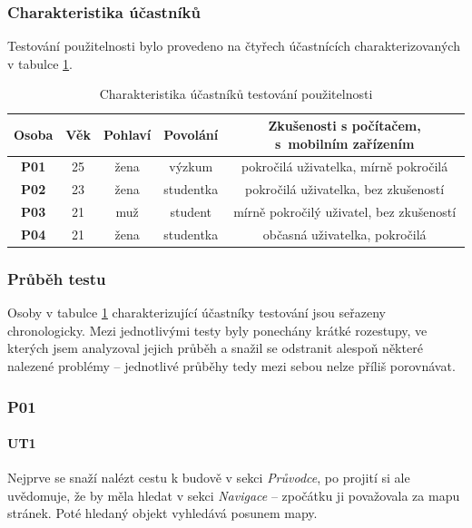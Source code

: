 \subsubsection{Charakteristika účastníků}
Testování použitelnosti bylo provedeno na čtyřech účastnících charakterizovaných v tabulce \ref{tab:charakteristikaUcastniku}. %
\begin{table}
\begin{center}
\begin{threeparttable}
\begin{tabular}{|c|c|c|c|c|}
\hline
\textbf{Osoba} & \textbf{Věk} & \textbf{Pohlaví} & \textbf{Povolání} & \parbox{2.2in}{\smallskip\textbf{Zkušenosti s počítačem, s~mobilním zařízením}\smallskip} \\
\hline
\textbf{P01} & 25 & žena & výzkum & \parbox{2.2in}{\smallskip pokročilá uživatelka, mírně pokročilá\smallskip} \\
\textbf{P02} & 23 & žena & studentka & \parbox{2.2in}{\smallskip pokročilá uživatelka, bez zkušeností\smallskip} \\
\textbf{P03} & 21 & muž & student & \parbox{2.2in}{\smallskip mírně pokročilý uživatel, bez zkušeností\smallskip} \\
\textbf{P04} & 21 & žena & studentka & \parbox{2.2in}{\smallskip občasná uživatelka, pokročilá\smallskip} \\
\hline
\end{tabular}
\caption{Charakteristika účastníků testování použitelnosti}
\label{tab:charakteristikaUcastniku}
\end{threeparttable}
\end{center}
\end{table}

\subsubsection{Průběh testu}
Osoby v tabulce \ref{tab:charakteristikaUcastniku} charakterizující účastníky testování jsou seřazeny chronologicky. Mezi jednotlivými testy byly ponechány krátké rozestupy, ve kterých jsem analyzoval jejich průběh a snažil se odstranit alespoň některé nalezené problémy -- jednotlivé průběhy tedy mezi sebou nelze příliš porovnávat.
\subsubsection*{P01}
\paragraph*{UT1}
Nejprve se snaží nalézt cestu k budově v sekci \textit{Průvodce}, po projití si ale uvědomuje, že by měla hledat v sekci \textit{Navigace} -- zpočátku ji považovala za mapu stránek. Poté hledaný objekt vyhledává posunem mapy.

